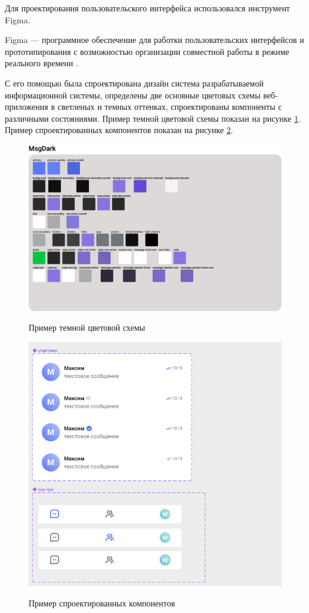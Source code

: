 Для проектирования пользовательского интерфейса использовался инструмент Figma.

Figma — программное обеспечение для работки пользовательских интерфейсов и прототипирования с возможностью организации совместной работы в режиме реального времени \cite{Figma}.

С его помощью была спроектирована дизайн система разрабатываемой информационной системы, определены две основные цветовых схемы веб-приложения в светленых и темных оттенках, спроектированы компоненты с различными состояниями. Пример темной цветовой схемы показан на рисунке \ref{fig:msg-color-schema}. Пример спроектированных компонентов показан на рисунке \ref{fig:msg-components}.

\begin{figure}[H]
\begin{center}
\includegraphics[width=0.75\hsize]{fig/msg-color-schema.png}\\[2mm]
\caption{Пример темной цветовой схемы}\label{fig:msg-color-schema}
\end{center}
\end{figure}

\begin{figure}[H]
\begin{center}
\includegraphics[width=0.7\hsize]{fig/msg-compoentns.png}\\[2mm]
\caption{Пример спроектированных компонентов}\label{fig:msg-components}
\end{center}
\end{figure}

